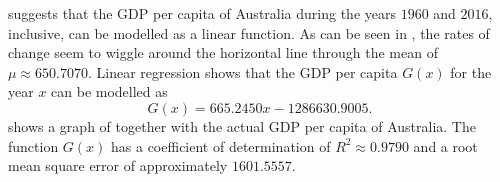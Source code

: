 \documentclass[a4paper,oneside,12pt]{article}
\begin{document}
\begin{problem}
{\begin{solution}
suggests that the GDP per capita of Australia during the years $1960$
and $2016$, inclusive, can be modelled as a linear function.  As can
be seen in , the
rates of change seem to wiggle around the horizontal line through the
mean of $\mu \approx 650.7070$.  Linear regression shows that the GDP
per capita $G(x)$ for the year $x$ can be modelled as
\begin{equation}
\label{eqn:logarithm:Australia_GPD_per_capita_formula}
G(x)
=
665.2450 x - 1286630.9005.
\end{equation}
 shows a graph of
 together
with the actual GDP per capita of Australia.  The function $G(x)$ has
a coefficient of determination of $R^2 \approx 0.9790$ and a root mean
square error of approximately $1601.5557$.


\end{solution}}
\end{problem}
\end{document}
